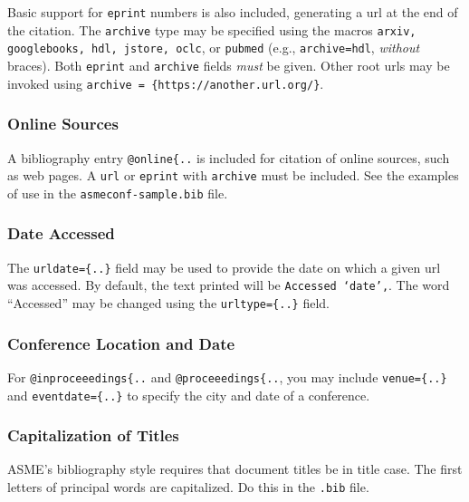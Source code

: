 \documentclass[grid,balance,upint,subscriptcorrection,varvw,mathalfa=cal=euler,spanish,french,greek,russian,vietnamese,colorlinks]{asmeconf}
\begin{document}
Basic support for \texttt{eprint} numbers is also included, generating a url at the end of the citation. The \texttt{archive} type may be specified using the macros \texttt{arxiv, google\-books, hdl, jstore, oclc}, or \texttt{pubmed} (e.g., \texttt{archive=hdl},  \textit{without} braces). Both \texttt{eprint} and \texttt{archive} fields \textit{must} be given. Other root urls may be invoked using \verb|archive = {https://another.url.org/}|.

\subsubsection*{Online Sources} A bibliography entry \verb|@online{..| is included for citation of online sources, such as web pages. A \texttt{url} or \texttt{eprint} with \texttt{archive} must be included. See the examples of use in the \texttt{asmeconf-sample.bib} file. 

\subsubsection*{Date Accessed} The \verb|urldate={..}| field may be used to provide the date on which a given url was accessed. By default, the text printed will be \texttt{Accessed `date',}. The word ``Accessed'' may be changed using the \verb|urltype={..}| field.

\subsubsection*{Conference Location and Date} For \verb|@inproceeedings{..| and \verb|@proceeedings{..|, you may include \verb|venue={..}| and \verb|eventdate={..}| to specify the city and date of a conference.

\subsubsection*{Capitalization of Titles} ASME's bibliography style requires that document titles be in title case. The first letters of principal words are capitalized. Do this in the \texttt{.bib} file.



\end{document}
